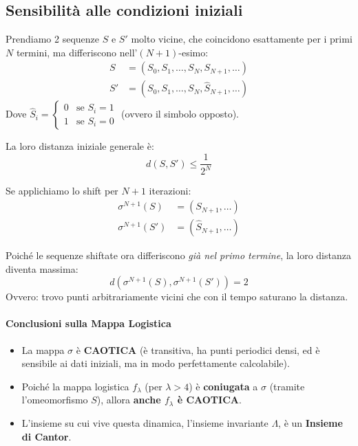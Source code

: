 \documentclass[openany]{book}
\theoremstyle{definition}
\theoremstyle{remark}
\begin{document}
\subsection{Sensibilità alle condizioni iniziali}

Prendiamo 2 sequenze $S$ e $S'$ molto vicine, che coincidono esattamente per i primi $N$ termini, ma differiscono nell'$(N+1)$-esimo:
\begin{align*}
    S &= (S_0, S_1, \dots, S_N, S_{N+1}, \dots) \\
    S' &= (S_0, S_1, \dots, S_N, \hat{S}_{N+1}, \dots)
\end{align*}
Dove $\hat{S}_i = \begin{cases} 0 & \text{se } S_i = 1 \\ 1 & \text{se } S_i = 0 \end{cases}$ (ovvero il simbolo opposto).

La loro distanza iniziale generale è:
$$ d(S, S') \leq \frac{1}{2^N} $$

Se applichiamo lo shift per $N+1$ iterazioni:
\begin{align*}
    \sigma^{N+1}(S) &= (S_{N+1}, \dots) \\
    \sigma^{N+1}(S') &= (\hat{S}_{N+1}, \dots)
\end{align*}

Poiché le sequenze shiftate ora differiscono \emph{già nel primo termine}, la loro distanza diventa massima:
$$ d(\sigma^{N+1}(S), \sigma^{N+1}(S')) = 2 $$
Ovvero: trovo punti arbitrariamente vicini che con il tempo saturano la distanza.

\paragraph{Conclusioni sulla Mappa Logistica}
\begin{itemize}
    \item La mappa $\sigma$ è \textbf{CAOTICA} (è transitiva, ha punti periodici densi, ed è sensibile ai dati iniziali, ma in modo perfettamente calcolabile).
    \item Poiché la mappa logistica $f_\lambda$ (per $\lambda > 4$) è \textbf{coniugata} a $\sigma$ (tramite l'omeomorfismo $S$), allora \textbf{anche $f_\lambda$ è CAOTICA}.
    \item L'insieme su cui vive questa dinamica, l'insieme invariante $\Lambda$, è un \textbf{Insieme di Cantor}.
\end{itemize}
\end{document}
